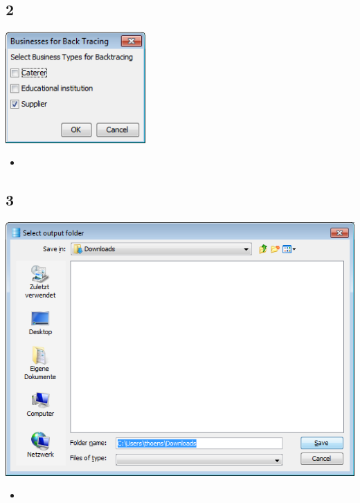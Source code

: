 \documentclass{beamer}
\begin{document}
\subsection{2}
\begin{frame}
	\begin{center}
  		\includegraphics[width=0.4\textwidth]{2.png}
	\end{center}
	\begin{itemize}
		\item
	\end{itemize}
\end{frame}

\subsection{3}
\begin{frame}
	\begin{center}
  		\includegraphics[height=0.5\textheight]{3.png}
	\end{center}
	\begin{itemize}
		\item
	\end{itemize}
\end{frame}
\end{document}
